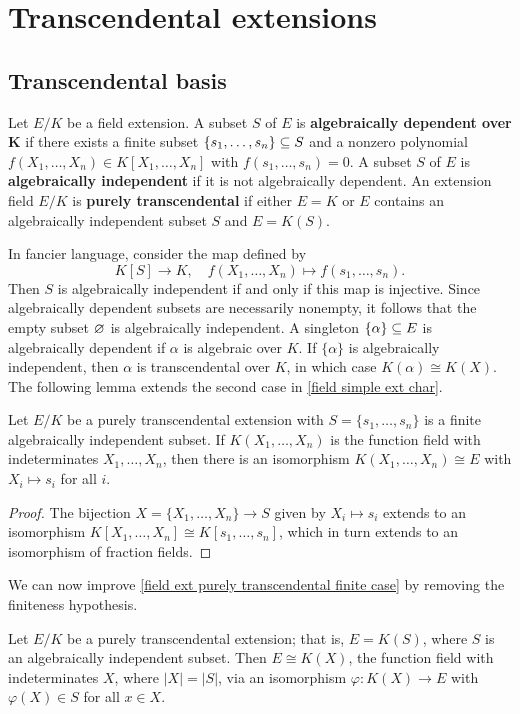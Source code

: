 \section{Transcendental extensions}
\subsection{Transcendental basis}
\begin{definition}
Let $E/K$ be a field extension. A subset $S$ of $E$ is \textbf{algebraically dependent over $\bm{K}$} if there exists a finite subset $\{s_1,\dots,s_n\}\subseteq S$ and a nonzero polynomial $f(X_1,\dots,X_n)\in K[X_1,\dots,X_n]$ with $f(s_1,\dots,s_n)=0$. A subset $S$ of $E$ is \textbf{algebraically independent} if it is not algebraically dependent. An extension field $E/K$ is \textbf{purely transcendental} if either $E=K$ or $E$ contains an algebraically independent subset $S$ and $E=K(S)$.
\end{definition}
In fancier language, consider the map defined by
\[K[S]\to K,\quad f(X_1,\dots,X_n)\mapsto f(s_1,\dots,s_n).\]
Then $S$ is algebraically independent if and only if this map is injective. Since algebraically dependent subsets are necessarily nonempty, it follows that the empty subset $\varnothing$ is algebraically independent. A singleton $\{\alpha\}\subseteq E$ is algebraically dependent if $\alpha$ is algebraic over $K$. If $\{\alpha\}$ is algebraically independent, then $\alpha$ is transcendental over $K$, in which case $K(\alpha)\cong K(X)$. The following lemma extends the second case in \cref{field simple ext char}.
\begin{lemma}\label{field ext purely transcendental finite case}
Let $E/K$ be a purely transcendental extension with $S=\{s_1,\dots,s_n\}$ is a finite algebraically independent subset. If $K(X_1,\dots,X_n)$ is the function field with indeterminates $X_1,\dots,X_n$, then there is an isomorphism $K(X_1,\dots,X_n)\cong E$ with $X_i\mapsto s_i$ for all $i$.
\end{lemma}
\begin{proof}
The bijection $X=\{X_1,\dots,X_n\}\to S$ given by $X_i\mapsto s_i$ extends to an isomorphism $K[X_1,\dots,X_n]\cong K[s_1,\dots,s_n]$, which in turn extends to an isomorphism of fraction fields.
\end{proof}
We can now improve \cref{field ext purely transcendental finite case} by removing the finiteness hypothesis.
\begin{theorem}\label{field ext purely transcendental iso to function field}
Let $E/K$ be a purely transcendental extension; that is, $E=K(S)$, where $S$ is an algebraically independent subset. Then $E\cong K(X)$, the function field with indeterminates $X$, where $|X|=|S|$, via an isomorphism $\varphi:K(X)\to E$ with $\varphi(X)\in S$ for all $x\in X$.
\end{theorem}
